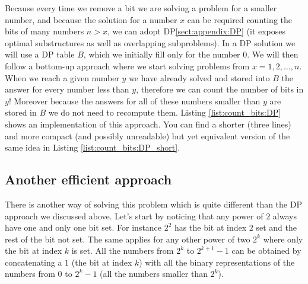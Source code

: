 Because every time we remove a bit we are solving a problem for a smaller number, and because the
solution for a number $x$ can be required counting the bits of many numbers $n>x$, we can adopt
DP\ref{sect:appendix:DP} (it exposes optimal substructures as well as overlapping subproblems). In a
DP solution we will use  a DP table $B$, which we initially fill only for the number $0$. We will
then follow a bottom-up approach where we start solving problems from $x=1,2,\ldots,n$. When we
reach a given number $y$ we have already solved and stored into $B$ the answer for every number less
than $y$, therefore we can count the number of bits in $y$! Moreover because the answers for all of
these numbers smaller than $y$ are stored in $B$ we do not need to recompute them. Listing
\ref{list:count_bits:DP} shows an implementation of this approach. You can find a shorter (three
lines) and more compact (and possibly unreadable) but yet equivalent version of the same idea in
Listing \ref{list:count_bits:DP_short}.





\subsection{Another efficient approach}
\label{count_bits:sec:pattern}
There is another way of solving this problem which is quite different than the DP approach we
discussed above. Let's start by noticing that any power of $2$ always have one and only one bit set.
For instance $2^2$ has the bit at index $2$ set and the rest of the bit not set. The same applies
for any other power of two $2^k$ where only the bit at index $k$ is set. All the numbers from $2^k$
to $2^{k+1}-1$ can be obtained by concatenating a $1$ (the bit at index $k$) with all the binary
representations of the numbers from $0$ to $2^k-1$ (all the numbers smaller than $2^k$).

